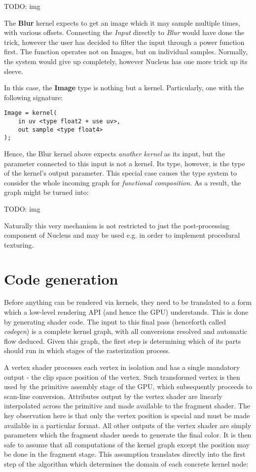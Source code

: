 TODO: img

The \textbf{Blur} kernel expects to get an image which it may sample multiple times, with various offsets. Connecting the \emph{Input} directly to \emph{Blur} would have done the trick, however the user has decided to filter the input through a power function first. The function operates not on Images, but on individual samples. Normally, the system would give up completely, however Nucleus has one more trick up its sleeve.

In this case, the \textbf{Image} type is nothing but a kernel. Particularly, one with the following signature:
	
\begin{lstlisting}[frame=single]
Image = kernel(
    in uv <type float2 + use uv>,
    out sample <type float4>
);
\end{lstlisting}

Hence, the Blur kernel above expects \emph{another kernel} as its input, but the parameter connected to this input is not a kernel. Its type, however, is the type of the kernel's output parameter. This special case causes the type system to consider the whole incoming graph for \emph{functional composition}. As a result, the graph might be turned into:

TODO: img

Naturally this very mechanism is not restricted to just the post-processing component of Nucleus and may be used e.g. in order to implement procedural texturing.
	
\section{Code generation}
\label{sec:codegen}

Before anything can be rendered via kernels, they need to be translated to a form which a low-level rendering API (and hence the GPU) understands. This is done by generating shader code. The input to this final pass (henceforth called \emph{codegen}) is a complete kernel graph, with all conversions resolved and automatic flow deduced. Given this graph, the first step is determining which of its parts should run in which stages of the rasterization process.

A vertex shader processes each vertex in isolation and has a single mandatory output - the clip space position of the vertex. Such transformed vertex is then used by the primitive assembly stage of the GPU, which subsequently proceeds to scan-line conversion. Attributes output by the vertex shader are linearly interpolated across the primitive and made available to the fragment shader. The key observation here is that only the vertex position is special and must be made available in a particular format. All other outputs of the vertex shader are simply parameters which the fragment shader needs to generate the final color. It is then safe to assume that all computations of the kernel graph except the position may be done in the fragment stage. This assumption translates directly into the first step of the algorithm which determines the domain of each concrete kernel node:

